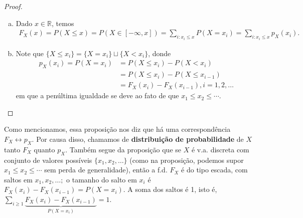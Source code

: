 \documentclass[../Notas.tex]{subfiles}
\begin{document}
\begin{proof}
\begin{enumerate}[(a)]
    \item Dado $x\in\mathbb{R}$, temos
    \begin{align*}
        F_X(x) = P(X\leq x) = P(X\in [-\infty, x]) = \sum_{i : x_i\leq x}P(X=x_i) = \sum_{i : x_i\leq x}p_X(x_i).
    \end{align*}
    \item Note que $\{ X\leq x_i \} = \{ X = x_i \} \sqcup \{ X < x_i \}$, donde
    \begin{align*}
        p_X(x_i) = P(X =x_i) &= P(X\leq x_i) - P(X<x_i) \\
        &= P(X\leq x_i) - P(X\leq x_{i-1}) \\
        &= F_X(x_i) - F_X(x_{i-1}), i = 1, 2, \dots
    \end{align*}
    em que a penúltima igualdade se deve ao fato de que $x_1\leq x_2\leq \cdots$.
\end{enumerate}
\end{proof}
Como mencionamos, essa proposição nos diz que há uma correspondência $F_X\leftrightarrow p_X$. Por causa disso, chamamos de \textbf{distribuição de probabilidade} de $X$ tanto $F_X$ quanto $p_X$. Também segue da proposição que se $X$ é v.a. discreta com conjunto de valores possíveis $\{x_1, x_2, \dots \}$ (como na proposição, podemos supor $x_1\leq x_2\leq\cdots$ sem perda de generalidade), então a f.d. $F_X$ é do tipo escada, com saltos em $x_1, x_2, \dots;$ o tamanho do salto em $x_i$ é $F_X(x_i) - F_X(x_{i-1}) = P(X=x_i)$. A soma dos saltos é 1, isto é, $\displaystyle{ \sum_{i\geq 1} \underbrace{F_X(x_i) - F_X(x_{i-1})}_{P(X=x_i)} = 1.}$ 
\end{document}

